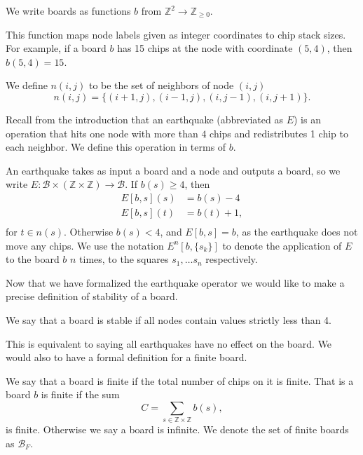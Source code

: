 \documentclass[runningheads,a4paper]{llncs}
\begin{document}
\begin{definition} We write boards as functions $b$ from $\mathbb{Z}^2 \to \mathbb{Z}_{\geq 0}$.
\end{definition}

This function maps node labels given as integer coordinates to chip stack sizes. For example, if a board $b$ has 15 chips at the node with coordinate $(5,4)$, then $b(5,4) = 15$.

\begin{definition} We define $n(i,j)$ to be the set of neighbors of node $(i,j)$
\begin{equation*}
n(i,j) = \{ (i+1, j), (i-1, j), (i, j-1), (i, j+1) \}.
\end{equation*}
\end{definition}

Recall from the introduction that an earthquake (abbreviated as $E$) is an operation that hits one node with more than $4$ chips and redistributes 1 chip to each neighbor. We define this operation in terms of $b$.

\begin{definition}
An earthquake takes as input a board and a node and outputs a board, so we write $E: \mathcal{B} \times (\mathbb{Z} \times \mathbb{Z}) \rightarrow \mathcal{B}$. If $b(s) \geq 4$, then
\begin{align*}
E[b, s](s) &= b(s)-4 \\
E[b, s](t) &= b(t)+1, \\
\end{align*}
for $ t \in n(s)$. Otherwise  $b(s) < 4$, and $E[b, s] = b$, as the earthquake does not move any chips.
We use the notation $E^n[b, \{s_k\}]$ to denote the application of $E$ to the board $b$ $n$ times, to the squares $s_1, \ldots s_{n}$ respectively. 
\end{definition}

Now that we have formalized the earthquake operator we would like to make a precise definition of stability of a board.
\begin{definition}
We say that a board is stable if all nodes contain values strictly less than 4. 
\end{definition}
This is equivalent to saying all earthquakes have no effect on the board. We would also to have a formal definition for a finite board. 

\begin{definition} 
We say that a board is finite if the total number of chips on it is finite. That is a board $b$ is finite if the sum
\begin{equation}
C= \sum_{s \in \mathbb{Z} \times \mathbb{Z}} b(s), 
\end{equation}
is finite. Otherwise we say a board is infinite. 
We denote the set of finite boards as $\mathcal{B}_F$.
\end{definition}
\end{document}
